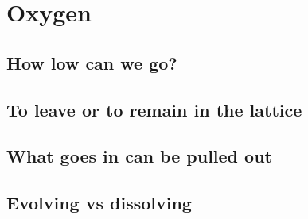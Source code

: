 
\chapter{Oxygen}
\section{How low can we go?}
\section{To leave or to remain in the lattice}
\section{What goes in can be pulled out}
\section{Evolving vs dissolving}